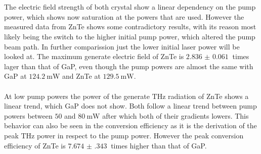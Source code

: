 \\\\
The electric field strength of both crystal show a linear dependency on the pump power, which shows now saturation at the powers that are used.
However the measured data from ZnTe shows some contradictory results, with its reason most likely being the switch to the higher initial pump power, which altered the pump beam path.
In further comparission just the lower initial laser power will be looked at.
The maximum generate electric field of ZnTe is $\SI{2.836(61)}{}$ times lager than that of GaP, even though the pump powers are almost the same with GaP at $\SI{124.2}{\milli\W}$ and ZnTe at $\SI{129.5}{\milli\W}$.
\\\\
At low pump powers the power of the generate $\si{\tera\hertz}$ radiation of ZnTe shows a linear trend, which GaP does not show.
Both follow a linear trend between pump powers between $50$ and $\SI{80}{\milli\W}$ after which both of their gradients lowers.
This behavior can also be seen in the conversion efficiency as it is the derivation of the peak $\si{\tera\hertz}$ power in respect to the pump power.
However the peak conversion efficiency of ZnTe is $\SI{7.674(343)}{}$ times higher than that of GaP. 
